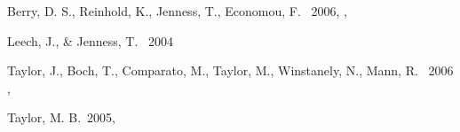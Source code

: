 \documentclass[11pt,twoside]{article}  %
\begin{document}
%
%
%
\begin{references}
 Berry, D. S., Reinhold, K., Jenness, T., Economou, F. 
           \ 2006, \adassxvi, 


 Leech, J., \& Jenness, T. \ 2004 \adassxiv

 Taylor, J., Boch, T., Comparato, M., Taylor, M., 
           Winstanely, N., Mann, R. \ 2006 \adassxvi, 

 Taylor, M. B.\ 2005, \adassxiv


\end{references}

\end{document}

